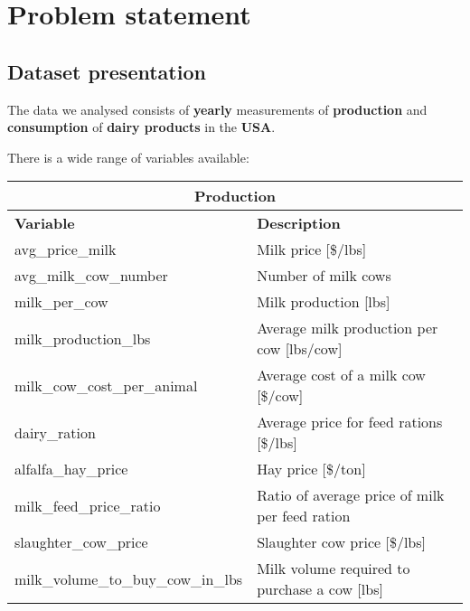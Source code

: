 \newpage
\section{Problem statement}

\subsection{Dataset presentation}

The data we analysed consists of \textbf{yearly} measurements of \textbf{production} and \textbf{consumption} of \textbf{dairy products} in the \textbf{USA}.

There is a wide range of variables available:

\begin{table}[H]
  \centering
  \begin{tabular}{p{6cm}p{7cm}}
    \toprule
    \multicolumn{2}{c}{\textbf{Production}} \\
    \midrule
    \textbf{Variable}                              & \textbf{Description}                                     \\
    \midrule
    avg\_price\_milk                      & Milk price [\$/lbs]                             \\
    avg\_milk\_cow\_number                & Number of milk cows                             \\
    milk\_per\_cow                        & Milk production [lbs]                           \\
    milk\_production\_lbs                 & Average milk production per cow [lbs/cow]       \\
    milk\_cow\_cost\_per\_animal          & Average cost of a milk cow [\$/cow]             \\
    dairy\_ration                         & Average price for feed rations [\$/lbs]         \\
    alfalfa\_hay\_price                   & Hay price [\$/ton]                              \\
    milk\_feed\_price\_ratio              & Ratio of average price of milk per feed ration  \\
    slaughter\_cow\_price                 & Slaughter cow price [\$/lbs]                    \\
    milk\_volume\_to\_buy\_cow\_in\_lbs   & Milk volume required to purchase a cow [lbs]    \\
    \bottomrule
    \end{tabular}
\end{table}

